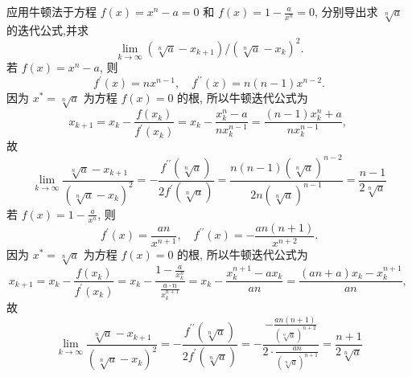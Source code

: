\begin{tcolorbox}[enhanced,colback=8,colframe=7,breakable,coltitle=green!25!black,title=2024]

应用牛顿法于方程 $ f(x)=x^{n}-a=0 $ 和 $ f(x)=1-\frac{a}{x^{n}}=0 $, 分别导出求 $ \sqrt[n]{a} $ 的迭代公式,并求
$$
\lim _{k \rightarrow \infty}\left(\sqrt[n]{a}-x_{k+1}\right) /\left(\sqrt[n]{a}-x_{k}\right)^{2} .
$$
\tcblower
若 $ f(x)=x^{n}-a $, 则
$$
f^{\prime}(x)=n x^{n-1}, \quad f^{\prime \prime}(x)=n(n-1) x^{n-2} .
$$
因为 $ x^{*}=\sqrt[n]{a} $ 为方程 $ f(x)=0 $ 的根, 所以牛顿迭代公式为
$$
x_{k+1}=x_{k}-\frac{f\left(x_{k}\right)}{f^{\prime}\left(x_{k}\right)}=x_{k}-\frac{x_{k}^{n}-a}{n x_{k}^{n-1}}=\frac{(n-1) x_{k}^{n}+a}{n x_{k}^{n-1}} \text {, }
$$
故
$$
\lim _{k \rightarrow \infty} \frac{\sqrt[n]{a}-x_{k+1}}{\left(\sqrt[n]{a}-x_{k}\right)^{2}}=-\frac{f^{\prime \prime}(\sqrt[n]{a})}{2 f^{\prime}(\sqrt[n]{a})}=\frac{n(n-1)(\sqrt[n]{a})^{n-2}}{2 n(\sqrt[n]{a})^{n-1}}=\frac{n-1}{2 \sqrt[n]{a}}
$$
若 $ f(x)=1-\frac{a}{x^{n}} $, 则
$$
f^{\prime}(x)=\frac{a n}{x^{n+1}}, \quad f^{\prime \prime}(x)=-\frac{a n(n+1)}{x^{n+2}} .
$$
因为 $ x^{*}=\sqrt[n]{a} $ 为方程 $ f(x)=0 $ 的根, 所以牛顿迭代公式为
$$
x_{k+1}=x_{k}-\frac{f\left(x_{k}\right)}{f^{\prime}\left(x_{k}\right)}=x_{k}-\frac{1-\frac{a}{x_{k}^{n}}}{\frac{a \cdot n}{x_{k}^{n+1}}}=x_{k}-\frac{x_{k}^{n+1}-a x_{k}}{a n}=\frac{(a n+a) x_{k}-x_{k}^{n+1}}{a n} \text {, }
$$
故
$$
\lim _{k \rightarrow \infty} \frac{\sqrt[n]{a}-x_{k+1}}{\left(\sqrt[n]{a}-x_{k}\right)^{2}}=-\frac{f^{\prime \prime}(\sqrt[n]{a})}{2 f^{\prime}(\sqrt[n]{a})}=-\frac{-\frac{a n(n+1)}{(\sqrt[n]{a})^{n+2}}}{2 \cdot \frac{a n}{(\sqrt[n]{a})^{n+1}}}=\frac{n+1}{2 \sqrt[n]{a}}
$$

 \end{tcolorbox}


